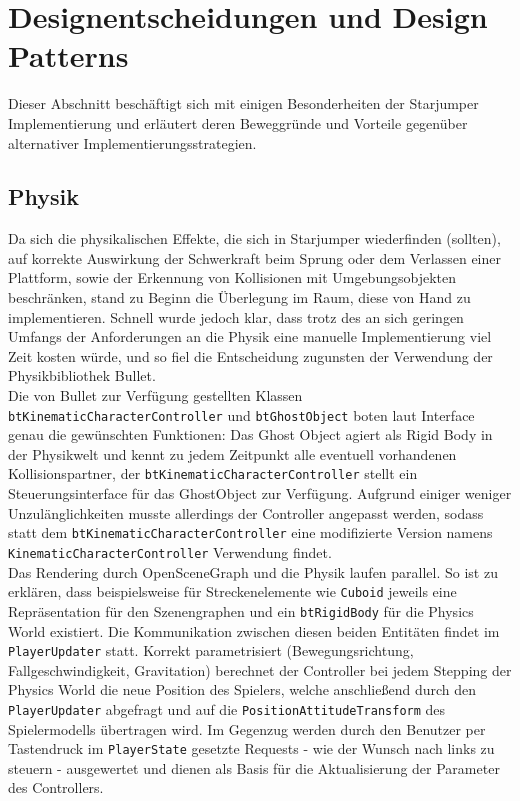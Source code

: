 \documentclass{llncs}
\begin{document}
\section{Designentscheidungen und Design Patterns}
Dieser Abschnitt besch\"aftigt sich mit einigen Besonderheiten der Starjumper Implementierung und erl\"autert deren
Beweggr\"unde und Vorteile gegen\"uber alternativer Implementierungsstrategien.

\subsection{Physik}
Da sich die physikalischen Effekte, die sich in Starjumper wiederfinden (sollten), auf korrekte Auswirkung der Schwerkraft
beim Sprung oder dem Verlassen einer Plattform, sowie der Erkennung von Kollisionen mit Umgebungsobjekten beschr\"anken,
stand zu Beginn die \"Uberlegung im Raum, diese von Hand zu implementieren. Schnell wurde jedoch klar, dass trotz des
an sich geringen Umfangs der Anforderungen an die Physik eine manuelle Implementierung viel Zeit kosten w\"urde, und so fiel
die Entscheidung zugunsten der Verwendung der Physikbibliothek Bullet.\\
Die von Bullet zur Verf\"ugung gestellten Klassen \texttt{btKinematicCharacterController} und \texttt{btGhostObject} boten
laut Interface genau die gew\"unschten Funktionen: Das Ghost Object agiert als Rigid Body in der Physikwelt und kennt
zu jedem Zeitpunkt alle eventuell vorhandenen Kollisionspartner, der \texttt{btKinematicCharacterController} stellt ein
Steuerungsinterface f\"ur das GhostObject zur Verf\"ugung. Aufgrund einiger weniger Unzul\"anglichkeiten musste allerdings
der Controller angepasst werden, sodass statt dem \texttt{btKinematicCharacterController} eine modifizierte Version
namens \texttt{KinematicCharacterController} Verwendung findet.\\
Das Rendering durch OpenSceneGraph und die Physik laufen parallel. So ist zu erkl\"aren, dass beispielsweise f\"ur
Streckenelemente wie \texttt{Cuboid} jeweils eine Repr\"asentation f\"ur den Szenengraphen und ein \texttt{btRigidBody}
f\"ur die Physics World existiert. Die Kommunikation zwischen diesen beiden Entit\"aten findet im \texttt{PlayerUpdater}
statt. Korrekt parametrisiert (Bewegungsrichtung, Fallgeschwindigkeit, Gravitation) berechnet der Controller bei jedem
Stepping der Physics World die neue Position des Spielers, welche anschlie\ss end durch den \texttt{PlayerUpdater}
abgefragt und auf die \texttt{PositionAttitudeTransform} des Spielermodells \"ubertragen wird. Im Gegenzug werden
durch den Benutzer per Tastendruck im \texttt{PlayerState} gesetzte Requests - wie der Wunsch nach links zu steuern -
ausgewertet und dienen als Basis f\"ur die Aktualisierung der Parameter des Controllers.
\end{document}
